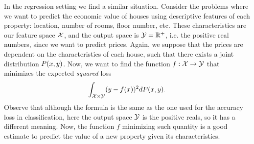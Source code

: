 %
In the regression setting we find a similar situation. Consider the problems where we want to predict the economic value of houses using descriptive features of each property: location, number of rooms, floor number, etc. These characteristics are our feature space $\mathcal{X}$, and the output space is $\mathcal{Y} = \mathbb{R}^+$, i.e. the positive real numbers, since we want to predict prices. Again, we suppose that the prices are dependent on the characteristics of each house, such that there exists a joint distribution $P(x, y)$.
Now, we want to find the function $f: \mathcal{X} \to \mathcal{Y}$ that minimizes the expected \emph{squared} loss
$$ \int_{\mathcal{X} \times \mathcal{Y}} (y - f(x))^2 dP(x, y) .$$
Observe that although the formula is the same as the one used for the accuracy loss in classification, here the output space $\mathcal{Y}$ is the positive reals, so it has a different meaning. Now, the function $f$ minimizing such quantity is a good estimate to predict the value of a new property given its characteristics.

